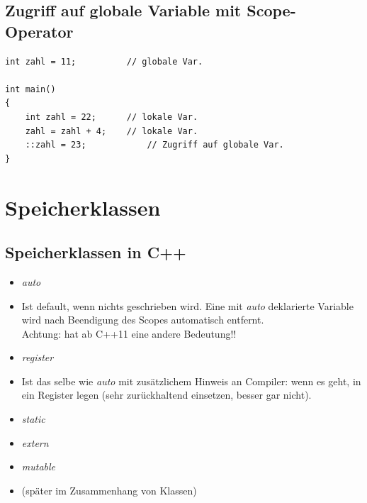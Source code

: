 \subsection{Zugriff auf globale Variable mit Scope-Operator}
\vspace{-\baselineskip}
\begin{minipage}{0.6\linewidth}
\begin{lstlisting}
int zahl = 11;			// globale Var.

int main()
{
	int zahl = 22;		// lokale Var.
	zahl = zahl + 4;	// lokale Var.
	::zahl = 23;			// Zugriff auf globale Var.
}
\end{lstlisting}
\end{minipage}
\pagebreak

\section{Speicherklassen}

\subsection{Speicherklassen in C++}
\begin{itemize}
	\item \emph{auto}
	\item[\-] Ist default, wenn nichts geschrieben wird. Eine mit \emph{auto} deklarierte Variable wird nach Beendigung des Scopes automatisch entfernt.\\
	Achtung: hat ab C++11 eine andere Bedeutung!!
	\item \emph{register}
	\item[\-] Ist das selbe wie \emph{auto} mit zusätzlichem Hinweis an Compiler: wenn es geht, in ein Register legen (sehr zurückhaltend einsetzen, besser gar nicht).
	\item \emph{static}
	\item \emph{extern}
	\item \emph{mutable}
	\item[\-] (später im Zusammenhang von Klassen)
\end{itemize}

